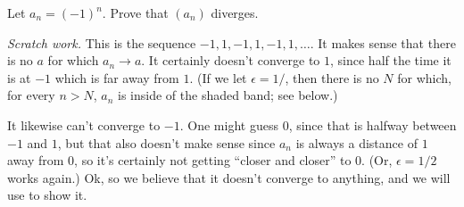\documentclass[11pt,twoside=off,numbers=noenddot]{scrbook}
\begin{document}
\begin{example}
  Let $a_n = (-1)^n$. Prove that $(a_n)$ diverges.

  \textit{Scratch work.} This is the sequence $-1, 1, -1, 1, -1, 1,
  \dots$. It makes sense that there is no $a$ for which $a_n \to a$.
  It certainly doesn't converge to $1$, since half the time it is at
  $-1$ which is far away from $1$. (If we let $\epsilon = 1/$, then
    there is no $N$ for which, for every $n > N$, $a_n$ is inside of
  the shaded band; see below.)
  \begin{tightfigure}
    \centering
  \end{tightfigure}
  It likewise can't converge to $-1$. One might guess $0$, since that
  is halfway between $-1$ and $1$, but that also doesn't make sense
  since $a_n$ is always a distance of $1$ away from $0$, so it's
  certainly not getting ``closer and closer'' to $0$. (Or, $\epsilon
  = 1/2$ works again.) Ok, so we believe that it doesn't converge to
  anything, and we will use  to show it.


\end{example}
\end{document}
